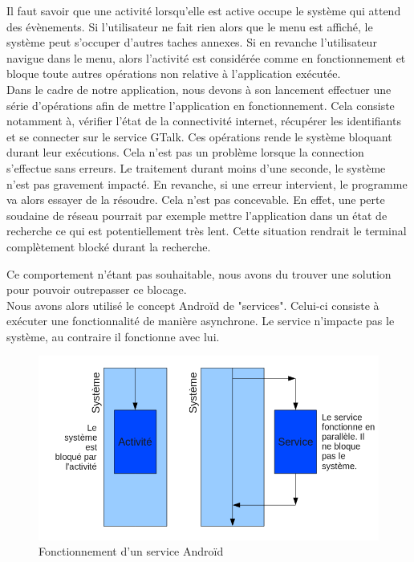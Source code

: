 Il faut savoir que une activité lorsqu'elle est active occupe le système qui attend des évènements.
Si l'utilisateur ne fait rien alors que le menu est affiché, le système peut s'occuper d'autres 
taches annexes. Si en revanche l'utilisateur navigue dans le menu, alors l'activité est considérée
comme en fonctionnement et bloque toute autres opérations non relative à l'application exécutée.
\\


Dans le cadre de notre application, nous devons à son lancement effectuer une série d'opérations 
afin de mettre l'application en fonctionnement. Cela consiste notamment à, vérifier l'état de la 
connectivité internet, récupérer les identifiants et se connecter sur le service GTalk. Ces 
opérations rende le système bloquant durant leur exécutions. Cela n'est pas un problème lorsque la 
connection s'effectue sans erreurs. Le traitement durant moins d'une seconde, le système n'est pas
gravement impacté. En revanche, si une erreur intervient, le programme va alors essayer de la résoudre.
Cela n'est pas concevable. En effet, une perte soudaine de réseau pourrait par exemple mettre 
l'application dans un état de recherche ce qui est potentiellement très lent. Cette situation rendrait
le terminal complètement blocké durant la recherche. 

Ce comportement n'étant pas souhaitable, nous avons du trouver une solution pour pouvoir outrepasser ce blocage.
\\


Nous avons alors utilisé le concept Androïd de "services". Celui-ci consiste à exécuter une fonctionnalité 
de manière asynchrone. Le service n'impacte pas le système, au contraire il fonctionne avec lui. 

\begin{figure}[!h]
	\center
	\includegraphics[width=13cm]{img/fonctionnement-des-services-android.png}
	\caption{Fonctionnement d'un service Androïd}
	\label{fonctionnement-des-services-android}
\end{figure}

